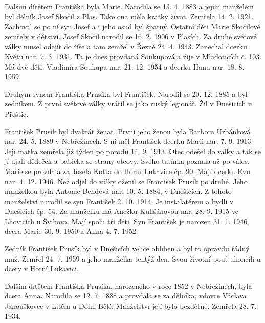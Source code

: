 \documentclass[../dejiny-rodu-prusiku.tex]{subfiles}
\begin{document}
Dalším dítětem Františka byla Marie. Narodila se 13. 4. 1883 a jejím manželem byl dělník Josef Skočil z Plas. Také ona měla krátký život. Zemřela 14. 2. 1921. Zachoval se po ní syn Josef a i jeho osud byl špatný. Ostatní dě­ti Marie Skočilové zemřely v dětství. Josef Skočil na­rodil se 16. 2. 1906 v Plasích. Za druhé světové války musel odejít do říše a tam zemřel v Řezně 24. 4. 1943. Zanechal dcerku Květu nar. 7. 3. 1931. Ta je dnes provdaná Soukupová a žije v Mladoticích č. 103. Má dvě děti. Vladimíra Soukupa nar. 21. 12. 1954 a dcerku Hanu nar. 18. 8. 1959.

Druhým synem Františka Prusíka byl František. Narodil se 20. 12. 1885 a byl zedníkem. Z první světové války vrátil se jako ruský legionář. Žil v Dnešicích u Přeštic.

František Prusík byl dvakrát ženat. První jeho ženou byla Barbora Urbánková nar. 24. 5. 1889 v Nebřežinech. S ní měl František dcerku Marii nar. 7. 9. 1913. Její matka zemřela již týden po porodu 14. 9. 1913. Otec odešel do války a tak se jí ujali dědeček a babička se strany otcovy. Svého tatínka poznala až po válce. Marie se provdala za Josefa Kotta do Horní Lukavice čp. 90. Mají dcerku Evu nar. 4. 12. 1946. Než odjel do války oženil se František Prusík po druhé. Jeho manželkou byla Antonie Bendová nar. 10. 5. 1884, v Dnešicích. Z tohoto manželství narodil se syn František 2. 10. 1914. Je instalatérem a bydlí v Dnešicích čp. 54. Za manželku má Anežku Kulišánovou nar. 28. 9. 1915 ve Lhovicích u Švihova. Mají spolu tři děti. Syn Fran­tišek je narozen 31. 1. 1946, dcera Marie 30. 9. 1950 a Anna 4. 7. 1952.

Zedník František Prusík byl v Dnešicích velice oblíben a byl to opravdu řádný muž. Zemřel 24. 7. 1959 a jeho manželka tentýž den. Svou životní pouť ukončili u dcery v Horní Lukavici.

Dalším dítětem Františka Prusíka, narozeného v roce 1852 v Nebřežinech, byla dcera Anna. Narodila se 12. 7. 1888 a provdala se za dělníka, vdovce Václava Janouškovce v Litém u Dolní Bělé. Manželství její bylo bezdětné. Zemřela 28. 7. 1934.
\end{document}
